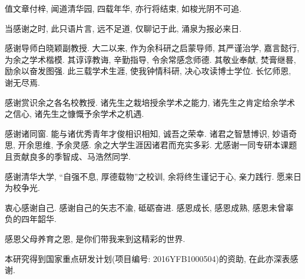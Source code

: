 \begin{acknowledgement}
值文章付梓, 闻道清华园, 四载年华, 亦行将结束, 如梭光阴不可追.

当感谢之时, 此只语片言, 远不足道, 仅聊记于此, 涌泉为报必来日.

感谢导师白晓颖副教授. 大二以来, 作为余科研之启蒙导师, 其严谨治学, 嘉言懿行, 为余之学术楷模. 其谆谆教诲, 辛勤指导, 令余常感念师德. 其敬业奉献, 焚膏继晷, 励余以奋发图强. 此三载学术生涯, 使我钟情科研, 决心攻读博士学位. 长忆师恩, 谢无尽焉.

感谢赏识余之各名校教授. 诸先生之栽培授余学术之能力, 诸先生之肯定给余学术之信心, 诸先生之慷慨予余学术之机遇.

感谢诸同窗. 能与诸优秀青年才俊相识相知, 诚吾之荣幸. 诸君之智慧博识, 妙语奇思, 开余思维, 予余灵感. 余之大学生涯因诸君而充实多彩. 尤感谢一同专研本课题且贡献良多的季智成、马浩然同学.

感谢清华大学, “自强不息, 厚德载物”之校训, 余将终生谨记于心, 亲力践行. 愿来日为校争光.

衷心感谢自己. 感谢自己的矢志不渝, 砥砺奋进. 感恩成长, 感恩成熟, 感恩未曾辜负的四年韶华.

感恩父母养育之恩, 是你们带我来到这精彩的世界.

本研究得到国家重点研发计划(项目编号: 2016YFB1000504)的资助, 在此亦深表感谢.

\end{acknowledgement}
